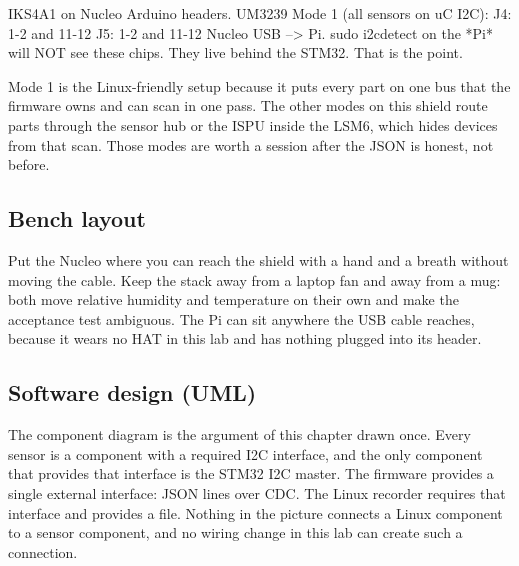 \begin{asciiart}
IKS4A1 on Nucleo Arduino headers.
UM3239 Mode 1 (all sensors on uC I2C):
  J4: 1-2 and 11-12
  J5: 1-2 and 11-12
Nucleo USB --> Pi.
sudo i2cdetect on the *Pi* will NOT see these chips.
They live behind the STM32. That is the point.
\end{asciiart}

Mode 1 is the Linux-friendly setup because it puts every part on one bus that the firmware
owns and can scan in one pass. The other modes on this shield route parts through the
sensor hub or the ISPU inside the LSM6, which hides devices from that scan. Those modes are
worth a session after the JSON is honest, not before.

\subsection*{Bench layout}


Put the Nucleo where you can reach the shield with a hand and a breath without moving the
cable. Keep the stack away from a laptop fan and away from a mug: both move relative
humidity and temperature on their own and make the acceptance test ambiguous. The Pi can
sit anywhere the USB cable reaches, because it wears no HAT in this lab and has nothing
plugged into its header.

\subsection*{Software design (UML)}


The component diagram is the argument of this chapter drawn once. Every sensor is a
component with a required I2C interface, and the only component that provides that
interface is the STM32 I2C master. The firmware provides a single external interface: JSON
lines over CDC. The Linux recorder requires that interface and provides a file. Nothing in
the picture connects a Linux component to a sensor component, and no wiring change in this
lab can create such a connection.

